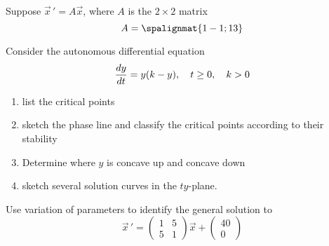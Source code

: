 \documentclass[11pt]{exam}
\begin{document}
\begin{questions}
    
    
\newpage \InitialsLeft

    \question[10] %
    Suppose $\vec x \, ' = A \vec x$, where $A$ is the $2\times 2$ matrix 
    $$A = \spalignmat{1 -1;1 3}$$
    

    

    
\newpage \InitialsRight

    \question[10] Consider the autonomous differential equation 
    $${\frac{dy}{dt}} = y(k - y), \quad t \ge 0, \quad k  > 0$$  %
    \begin{enumerate}[label=(\roman*)]
        \item list the critical points \vspace{1cm}
        \item sketch the phase line and classify the critical points according to their stability \vspace{4cm}
        \item Determine where $y$ is concave up and concave down \vspace{6cm}
        \item sketch several solution curves in the $ty$-plane. 
    \end{enumerate}

\newpage \InitialsLeft

    \question[8] 
    
    Use variation of parameters to identify the general solution to \[\vec{x} \, ' = \left( \begin{array}{rr} 1 & 5 \\ 5 & 1 \end{array} \right) \vec{x}  + \left( \begin{array}{r}  40\\ 0\end{array} \right)  \]   %
    

\end{questions}
\end{document}
